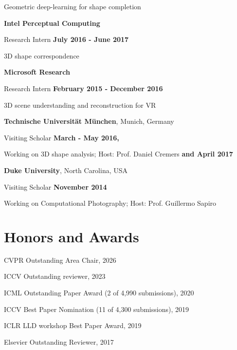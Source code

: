 \documentclass[margin,line]{res}
\begin{document}
\begin{resume}
\vspace{-.3cm}
{Geometric deep-learning for shape completion}

{\bf Intel Perceptual Computing} 

\vspace{-.3cm}
{Research Intern} \hfill {\bf July 2016 - June 2017}

\vspace{-.3cm}
{3D shape correspondence}

{\bf Microsoft Research} 

\vspace{-.3cm}
{Research Intern} \hfill {\bf February 2015 - December 2016}

\vspace{-.3cm}
{3D scene understanding and reconstruction for VR}

{\bf Technische Universit\"{a}t M\"{u}nchen}, Munich, Germany 

\vspace{-.3cm}
{Visiting Scholar} \hfill {\bf March - May 2016,}

\vspace{-.3cm}
{Working on 3D shape analysis; Host: Prof. Daniel Cremers}
\hfill {\bf and April 2017}

{\bf Duke University}, North Carolina, USA

\vspace{-.3cm}
{Visiting Scholar} \hfill {\bf November 2014}

\vspace{-.3cm}
{Working on Computational Photography; Host: Prof. Guillermo Sapiro} 

\section{\sc Honors and Awards}
CVPR Outstanding Area Chair, 2026
\vspace*{-2.5mm}

ICCV Outstanding reviewer, 2023
\vspace*{-2.5mm}

ICML Outstanding Paper Award (2 of 4,990 submissions), 2020
\vspace*{-2.5mm}

ICCV Best Paper Nomination (11 of 4,300 submissions), 2019
\vspace*{-2.5mm}

ICLR LLD workshop Best Paper Award, 2019

\vspace*{-2.5mm}
Elsevier Outstanding Reviewer, 2017


\end{resume}
\end{document}
